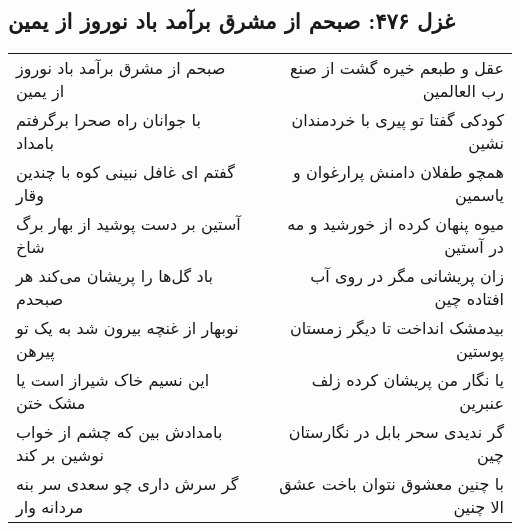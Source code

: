 \begin{center}
\section*{غزل ۴۷۶: صبحم از مشرق برآمد باد نوروز از یمین}
\label{sec:476}
\begin{longtable}{l p{0.5cm} r}
صبحم از مشرق برآمد باد نوروز از یمین
&&
عقل و طبعم خیره گشت از صنع رب العالمین
\\
با جوانان راه صحرا برگرفتم بامداد
&&
کودکی گفتا تو پیری با خردمندان نشین
\\
گفتم ای غافل نبینی کوه با چندین وقار
&&
همچو طفلان دامنش پرارغوان و یاسمین
\\
آستین بر دست پوشید از بهار برگ شاخ
&&
میوه پنهان کرده از خورشید و مه در آستین
\\
باد گل‌ها را پریشان می‌کند هر صبحدم
&&
زان پریشانی مگر در روی آب افتاده چین
\\
نوبهار از غنچه بیرون شد به یک تو پیرهن
&&
بیدمشک انداخت تا دیگر زمستان پوستین
\\
این نسیم خاک شیراز است یا مشک ختن
&&
یا نگار من پریشان کرده زلف عنبرین
\\
بامدادش بین که چشم از خواب نوشین بر کند
&&
گر ندیدی سحر بابل در نگارستان چین
\\
گر سرش داری چو سعدی سر بنه مردانه وار
&&
با چنین معشوق نتوان باخت عشق الا چنین
\\
\end{longtable}
\end{center}
